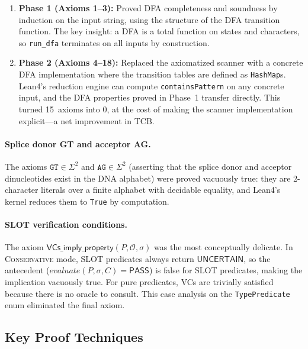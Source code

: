 \documentclass[acmsmall,review,anonymous]{acmart}
\newcommand{\PASS}{\ensuremath{\mathsf{PASS}}\xspace}
\newcommand{\UNCERTAIN}{\ensuremath{\mathsf{UNCERTAIN}}\xspace}
\newcommand{\seq}{\sigma}
\newcommand{\pred}{P}
\newcommand{\CONSERVATIVE}{\textsc{Conservative}\xspace}
\begin{document}
\begin{enumerate}[leftmargin=*,itemsep=1pt,topsep=2pt]
\item \textbf{Phase 1 (Axioms 1--3):}
  Proved DFA completeness and soundness by induction on the input
  string, using the structure of the DFA transition function.
  The key insight: a DFA is a total function on states and characters,
  so \texttt{run\_dfa} terminates on all inputs by construction.

\item \textbf{Phase 2 (Axioms 4--18):}
  Replaced the axiomatized scanner with a concrete DFA implementation
  where the transition tables are defined as \texttt{HashMap}s.
  Lean4's reduction engine can compute \texttt{containsPattern} on any
  concrete input, and the DFA properties proved in Phase~1 transfer
  directly.
  This turned 15~axioms into 0, at the cost of making the scanner
  implementation explicit---a net improvement in TCB.
\end{enumerate}

\paragraph{Splice donor GT and acceptor AG.}
The axioms $\texttt{GT} \in \Sigma^2$ and $\texttt{AG} \in \Sigma^2$
(asserting that the splice donor and acceptor dinucleotides exist in the
DNA alphabet) were proved vacuously true: they are 2-character
literals over a finite alphabet with decidable equality, and Lean4's
kernel reduces them to \texttt{True} by computation.

\paragraph{SLOT verification conditions.}
The axiom
$\textsf{VCs\_imply\_property}(\pred, \mathcal{O}, \seq)$
was the most conceptually delicate.
In \CONSERVATIVE{} mode, SLOT predicates always return \UNCERTAIN,
so the antecedent ($\mathit{evaluate}(\pred, \seq, C) = \PASS$)
is false for SLOT predicates, making the implication vacuously true.
For pure predicates, VCs are trivially satisfied because there is no
oracle to consult.
This case analysis on the \texttt{TypePredicate} enum eliminated the
final axiom.

\subsection{Key Proof Techniques}\label{sec:proof-techniques}
\end{document}
